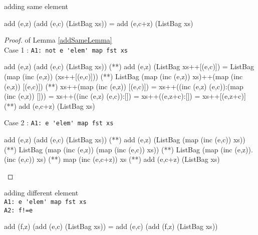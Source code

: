 \begin{lemma}\label{addSameLemma} adding same element
\begin{code}
add (e,z) (add (e,c) (ListBag xs)) = add (e,c+z) (ListBag xs)
\end{code}
\end{lemma}
\begin{proof} of Lemma \ref{addSameLemma}\\
Case 1 : \verb|A1: not e 'elem' map fst xs|
\begin{code}
add (e,z) (add (e,c) (ListBag xs)) 
             (**) add (e,z) (ListBag xs++[(e,c)])
             = ListBag (map (inc (e,z)) (xs++[(e,c)]))
             (**) ListBag (map (inc (e,z)) xs)++(map (inc (e,z)) [(e,c)])
             (**) xs++(map (inc (e,z)) [(e,c)])
             = xs++((inc (e,z) (e,c)):(map (inc (e,z)) []))
             = xs++((inc (e,z) (e,c)):[])
             = xs++((e,z+c):[])
             = xs++[(e,z+c)]
             (**) add (e,c+z) (ListBag xs)
\end{code}
Case 2 : \verb|A1: e 'elem' map fst xs|
\begin{code}
add (e,z) (add (e,c) (ListBag xs)) 
             (**) add (e,z) (ListBag (map (inc (e,c)) xs))
             (**) ListBag (map (inc (e,z)) (map (inc (e,c)) xs))
             (**) ListBag (map (inc (e,z)).(inc (e,c)) xs)
             (**) map (inc (e,c+z)) xs
             (**) add (e,c+z) (ListBag xs)
\end{code}
\end{proof}
\begin{lemma}\label{addDiffLemma}adding different element\\
\verb|A1: e 'elem' map fst xs|\\
\verb|A2: f!=e|
\begin{code}
add (f,z) (add (e,c) (ListBag xs)) = add (e,c) (add (f,z) (ListBag xs))
\end{code}
\end{lemma}

